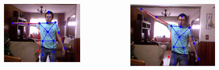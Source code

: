 \documentclass{beamer}
\begin{document}
\begin{frame}


\begin{columns}[c] %

\begin{figure}
\includegraphics[width=0.9\linewidth]{comp1.png}
\end{figure}


\begin{figure}
\includegraphics[width=0.9\linewidth]{comp2.png}
\end{figure}

\end{columns}



\end{frame}
\end{document}
